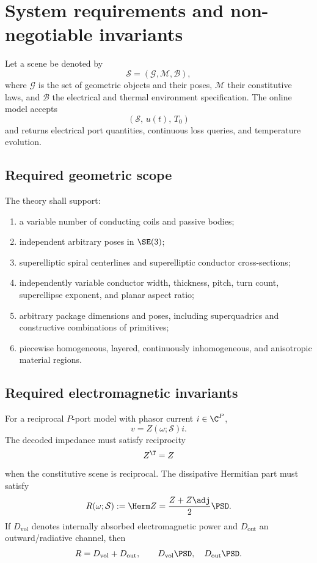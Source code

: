 \section{System requirements and non-negotiable invariants}

Let a scene be denoted by
\[
  \mathcal S=(\mathcal G,\mathcal M,\mathcal B),
\]
where $\mathcal G$ is the set of geometric objects and their poses,
$\mathcal M$ their constitutive laws, and $\mathcal B$ the electrical and
thermal environment specification. The online model accepts
\[
  (\mathcal S,\,u(t),\,T_0)
\]
and returns electrical port quantities, continuous loss queries, and
temperature evolution.

\subsection{Required geometric scope}

The theory shall support:
\begin{enumerate}[label=(G\arabic*)]
\item a variable number of conducting coils and passive bodies;
\item independent arbitrary poses in $\SE(3)$;
\item superelliptic spiral centerlines and superelliptic conductor cross-sections;
\item independently variable conductor width, thickness, pitch, turn count,
      superellipse exponent, and planar aspect ratio;
\item arbitrary package dimensions and poses, including superquadrics and
      constructive combinations of primitives;
\item piecewise homogeneous, layered, continuously inhomogeneous, and
      anisotropic material regions.
\end{enumerate}

\subsection{Required electromagnetic invariants}

For a reciprocal $P$-port model with phasor current $i\in\C^P$,
\[
  v=Z(\omega;\mathcal S)i .
\]
The decoded impedance must satisfy reciprocity
\[
  Z^\T=Z
\]
when the constitutive scene is reciprocal. The dissipative Hermitian part
must satisfy
\[
  R(\omega;\mathcal S)
  :=\Herm Z
  =\frac{Z+Z\adj}{2}\PSD .
\]
If $D_{\mathrm{vol}}$ denotes internally absorbed electromagnetic power and
$D_{\mathrm{out}}$ an outward/radiative channel, then
\[
  R=D_{\mathrm{vol}}+D_{\mathrm{out}},\qquad
  D_{\mathrm{vol}}\PSD,\quad D_{\mathrm{out}}\PSD .
\]

